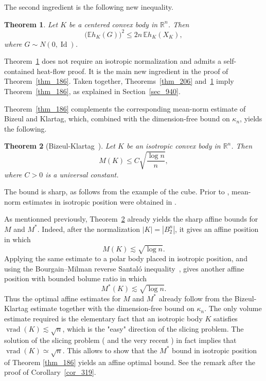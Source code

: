 \documentclass[12pt]{article}
\newtheorem{theorem}{Theorem}[section]
\theoremstyle{definition}
\theoremstyle{remark}
\newcommand{\R}{\mathbb R}
\newcommand{\E}{\mathbb E}
\newcommand{\Id}{\operatorname{Id}}
\begin{document}
The second ingredient is the following new inequality.

\begin{theorem}\label{thm_230}
Let $K$ be a centered convex body in $\R^n$. Then
\begin{equation}\label{eq_232}
  \bigl(\E h_K(G)\bigr)^2
  \leq
  2n\,\E h_K(X_K),
\end{equation}
where $G\sim N(0,\Id)$.
\end{theorem}

Theorem~\ref{thm_230} does not require an isotropic normalization
and admits a self-contained heat-flow proof. It is the main new
ingredient in the proof of Theorem~\ref{thm_186}. Taken
together, Theorems~\ref{thm_206} and~\ref{thm_230}
imply Theorem~\ref{thm_186}, as explained in
Section~\ref{sec_940}.

Theorem~\ref{thm_186} complements the corresponding mean-norm
estimate of Bizeul and Klartag, which, combined with the
dimension-free bound on $\kappa_n$, yields the following.

\begin{theorem}[Bizeul-Klartag~\cite{BizeulKlartag}]
\label{thm_252}
Let $K$ be an isotropic convex body in $\R^n$. Then
\begin{equation}\label{eq_254}
  M(K)
  \leq
  C\sqrt{\frac{\log n}{n}},
\end{equation}
where $C>0$ is a universal constant.
\end{theorem}

The bound is sharp, as follows from the example of the cube. Prior to \cite{BizeulKlartag}, mean-norm estimates in isotropic position were obtained in 
\cite{GiannopoulosMilman2,GiannopoulosStavrakakisTsolomitisVritsiou, VritsiouRegularEllipsoids}.

As mentionned previously, Theorem~\ref{thm_252} already yields the
sharp affine bounds for $M$ and $M^*$. Indeed, after the
normalization $|K|=|B_2^n|$, it gives an affine position in which
\[
  M(K)\lesssim\sqrt{\log n}.
\]
Applying the same estimate to a polar body placed in isotropic
position, and using the Bourgain--Milman reverse Santal\'o
inequality~\cite{BourgainMilman,ArtsteinAvidanGiannopoulosMilman}, gives
another affine position with bounded bolume ratio in which
\[
  M^*(K)\lesssim\sqrt{\log n}.
\]
Thus the optimal affine estimates for $M$ and $M^*$ already follow from
the Bizeul-Klartag estimate together with the dimension-free bound on
$\kappa_n$. The
only volume estimate required is the elementary fact that an isotropic body $K$ satisfies
$\operatorname{vrad}(K)\lesssim\sqrt n$, which is the "easy" direction of the slicing problem. The solution of the slicing problem (\cite{KlartagLehecSlicing, BizeulSlicing} and the very recent \cite{BrazitikosSlicing}) in fact implies that $\operatorname{vrad}(K)\simeq\sqrt n$. This allows to show that the $M^*$ bound in isotropic position of Theorem \ref{thm_186} yields an affine optimal bound. See the remark after the proof of
Corollary~\ref{cor_319}.
\end{document}
